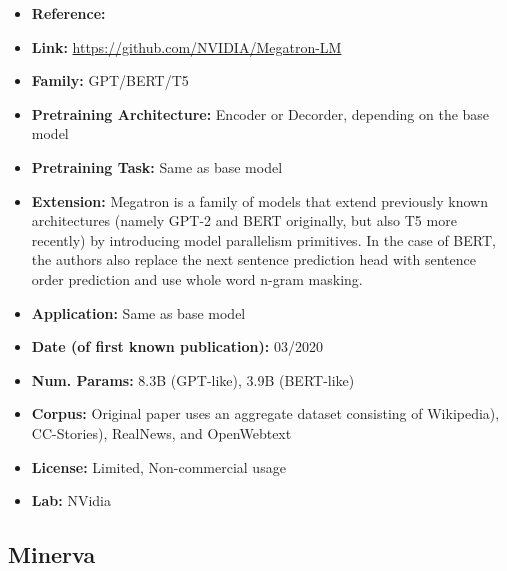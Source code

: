 \documentclass{article}
\begin{document}
            \begin{itemize}
                \item \textbf{Reference:} 
                \item \textbf{Link:} \url{https://github.com/NVIDIA/Megatron-LM}
                \item \textbf{Family:} GPT/BERT/T5 
                \item \textbf{Pretraining Architecture:} Encoder or Decorder, depending on the base model
                \item \textbf{Pretraining Task:} Same as base model
                \item \textbf{Extension:} Megatron is a family of models that extend previously known architectures (namely GPT-2 and BERT originally, but also T5 more recently) by introducing model parallelism primitives. In the case of BERT, the authors also replace the next sentence prediction head with sentence order prediction and use whole word n-gram masking.  
                \item \textbf{Application:} Same as base model
                \item \textbf{Date (of first known publication):} 03/2020
                \item \textbf{Num. Params:} 8.3B (GPT-like), 3.9B (BERT-like)
                \item \textbf{Corpus:} Original paper uses an aggregate dataset consisting of Wikipedia), CC-Stories), RealNews, and OpenWebtext
                \item \textbf{License:} Limited, Non-commercial usage
                \item \textbf{Lab:} NVidia
            \end{itemize}

\subsection{Minerva}
\end{document}
